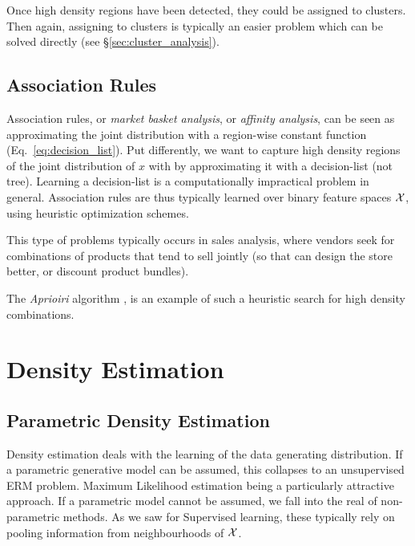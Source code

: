 Once high density regions have been detected, they could be assigned to clusters. Then again, assigning to clusters is typically an easier problem which can be solved directly (see \S\ref{sec:cluster_analysis}).



\subsection{Association Rules}
\label{sec:association}
Association rules, or \emph{market basket analysis}, or \emph{affinity analysis}, can be seen as approximating the joint distribution with a region-wise constant function (Eq.~\ref{eq:decision_list}).
Put differently, we want to capture high density regions of the joint distribution of $x$ with by approximating it with a decision-list (not tree).
Learning a decision-list is a computationally impractical problem in general. Association rules are thus typically learned over binary feature spaces $\mathcal{X}$, using heuristic optimization schemes.

This type of problems typically occurs in sales analysis, where vendors seek for combinations of products that tend to sell jointly (so that can design the store better, or discount product bundles).

The \emph{Aprioiri} algorithm \cite{agraval_fast_1994}, is an example of such a heuristic search for high density combinations.






\section{Density Estimation}
\label{sec:density_estimation}




\subsection{Parametric Density Estimation}
Density estimation deals with the learning of the data generating distribution.
If a parametric generative model can be assumed, this collapses to an unsupervised ERM problem. 
Maximum Likelihood estimation being a particularly attractive approach.
If a parametric model cannot be assumed, we fall into the real of non-parametric methods. As we saw for Supervised learning, these typically rely on pooling information from neighbourhoods of $\mathcal{X}$.




